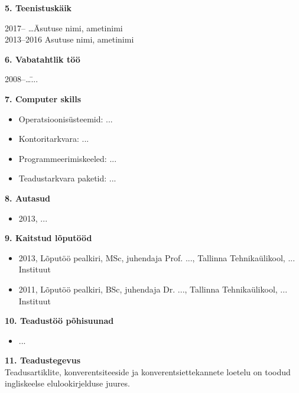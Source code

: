 \textbf{5. Teenistusk\"aik}
\begin{tabbing}
2017-- \ldots \quad\quad \= Asutuse nimi, ametinimi \\
2013--2016  \> Asutuse nimi, ametinimi \\
\end{tabbing}

\textbf{6. Vabatahtlik t\"o\"o}
\begin{tabbing}
2008--\ldots \quad\quad \= ... \\
\end{tabbing}

\textbf{7. Computer skills}
\begin{itemize}
\item Operatsioonis\"{u}steemid: ...
\item Kontoritarkvara: ...
\item Programmeerimiskeeled: ...
\item Teadustarkvara paketid: ...
\end{itemize}


\textbf{8. Autasud}
\begin{itemize}
\item 2013, ...
\end{itemize}
\newpage

\textbf{9. Kaitstud l\~oput\"o\"od} 
\begin{itemize}
\item 2013, L\~oput\"o\"o pealkiri, MSc, juhendaja Prof. ...,  Tallinna Tehnika\"ulikool, ... Instituut
\item 2011, L\~oput\"o\"o pealkiri, BSc, juhendaja Dr. ..., Tallinna Tehnika\"ulikool, ... Instituut

\end{itemize}

\textbf{10. Teadust\"o\"o p\~ohisuunad} 
\begin{itemize}
\item ...
\end{itemize}

\textbf{11. Teadustegevus}\\
Teadusartiklite, konverentsiteeside ja konverentsiettekannete loetelu on toodud ingliskeelse elulookirjelduse juures. 




